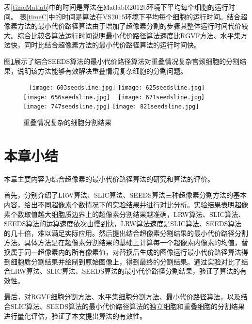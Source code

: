\documentclass[nomlist,masters]{seuthesix}
\begin{document}
表\ref{timeMatlab}中的时间是算法在MatlabR2012b环境下平均每个细胞的运行时间。
表\ref{timeC}中的时间是算法在VS2015环境下平均每个细胞的运行时间。结合超像素方法的最小代价路径算法由于增加了超像素分割的步骤其整体运行时间代价较大。综合比较各算法运行时间说明最小代价路径算法速度比RGVF方法、水平集方法快，同时比结合超像素方法的最小代价路径算法的运行时间快。

图\ref{retSumgood}展示了结合SEEDS算法的最小代价路径算法对重叠情况复杂宫颈细胞的分割结果，说明该方法能够有效解决重叠情况复杂细胞的分割问题。
\begin{figure}[H]
\centering 
\texttt{[image: 603seedsline.jpg]}
\hspace{0.001\textwidth}
\texttt{[image: 625seedsline.jpg]}
\hspace{0.001\textwidth}
\texttt{[image: 656seedsline.jpg]}
\vfill
\vspace{6pt}
\centering 
\texttt{[image: 671seedsline.jpg]}
\hspace{0.001\textwidth}
\texttt{[image: 747seedsline.jpg]}
\hspace{0.001\textwidth}
\texttt{[image: 821seedsline.jpg]}
\caption{重叠情况复杂的细胞分割结果}
\label{retSumgood}
\end{figure}

\section{本章小结}
本章主要内容为结合超像素的最小代价路径算法的研究和算法的评价。

首先，分别介绍了LRW算法、SLIC算法、SEEDS算法三种超像素分割方法的基本内容，给出不同超像素个数情况下的实验结果并进行对比分析。实验结果表明超像素个数取值越大细胞质边界上的超像素分割结果越准确，LRW算法、SLIC算法、SEEDS算法的运算速度依次由慢到快，LRW算法速度是SLIC算法、SEEDS算法的几十倍，难以满足实际应用。然后提出结合超像素分割结果的最小代价路径分割方法。具体方法是在超像素分割结果的基础上计算每一个超像素内像素的均值，替换属于同一超像素内的所有像素值，对替换后生成的图像运行最小代价路径算法得到细胞质分割结果并绘制到原始图像上，得到最终的分割结果。通过实验对比了结合LRW算法、SLIC算法、SEEDS算法的最小代价路径分割结果，验证了算法的有效性。

最后，对RGVF细胞分割方法、水平集细胞分割方法、最小代价路径算法，以及结合SLIC算法、SEEDS算法的最小代价路径算法的独立细胞和重叠细胞的分割结果进行量化评估，验证了本文提出算法的有效性。
\end{document}
